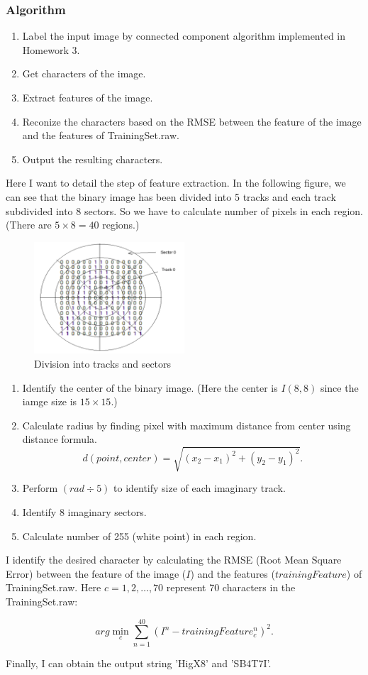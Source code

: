 \documentclass{article}
\begin{document}
\subsubsection*{Algorithm}
\begin{enumerate}
    \item Label the input image by connected component algorithm implemented in Homework 3.
    \item Get characters of the image.
    \item Extract features of the image.
    \item Reconize the characters based on the RMSE between the feature of the image and the features of TrainingSet.raw.
    \item Output the resulting characters.
\end{enumerate}

Here I want to detail the step of feature extraction. In the following figure, we can see that the binary image has been divided into 5 tracks and each track subdivided into 8 sectors. So we have to calculate number of pixels in each region. (There are $5 \times 8 = 40$ regions.)

\begin{figure}[!htb]
    \centering
    \includegraphics[width=0.5\textwidth]{img/circle.png}
    \caption{Division into tracks and sectors}
\end{figure}

\begin{enumerate}
    \item Identify the center of the binary image. (Here the center is $I(8, 8)$ since the iamge size is $15 \times 15$.)
    \item Calculate radius by finding pixel with maximum
    distance from center using distance formula.
    $$d(point, center) = \sqrt{(x_2 - x_1)^2 + (y_2 - y_1)^2}.$$
    \item Perform $(rad \div 5)$ to identify size of each imaginary track.
    \item Identify 8 imaginary sectors.
    \item Calculate number of 255 (white point) in each region.
\end{enumerate}

I identify the desired character by calculating the RMSE (Root Mean Square Error) between the feature of the image ($I$) and the features ($trainingFeature$) of TrainingSet.raw. Here $c = 1, 2, \dots, 70$ represent 70 characters in the TrainingSet.raw:

$$arg \min_c \sum_{n = 1}^{40} (I^n - trainingFeature_c^n)^2.$$

Finally, I can obtain the output string 'HigX8' and 'SB4T7I'.
\end{document}

